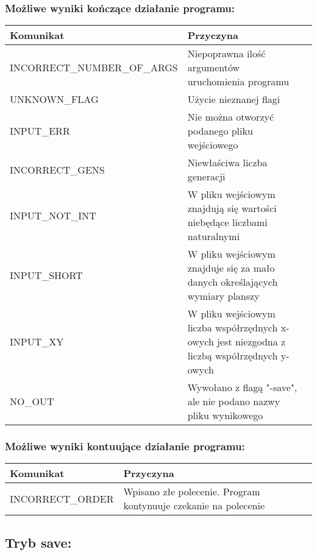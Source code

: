 \documentclass[11pt,a4paper]{report}
\begin{document}
\subsubsection {Możliwe wyniki kończące działanie programu:}
\begin{tabularx}{\textwidth}{  X|Xl  }
 \hline
 Komunikat                                   					& Przyczyna\\
 \hline \hline
			INCORRECT\_NUMBER\_OF\_ARGS	&Niepoprawna ilość argumentów uruchomienia programu\\
 \hline
			UNKNOWN\_FLAG	 			&Użycie nieznanej flagi\\
 \hline
			INPUT\_ERR					&Nie można otworzyć podanego pliku wejściowego\\
 \hline
			INCORRECT\_GENS				&Niewłaściwa liczba generacji\\
 \hline
			INPUT\_NOT\_INT				&W pliku wejściowym znajdują się wartości niebędące liczbami naturalnymi\\
 \hline
			INPUT\_SHORT				&W pliku wejściowym znajduje się za mało danych określających wymiary planszy\\
 \hline
			INPUT\_XY					&W pliku wejściowym liczba współrzędnych x-owych jest niezgodna z liczbą współrzędnych y-owych\\
 \hline
			NO\_OUT					&Wywołano z flagą "-save", ale nie podano nazwy pliku wynikowego\\
 \hline
\end{tabularx}

\subsubsection{Możliwe wyniki kontuujące działanie programu:}
\begin{tabularx}{\textwidth}{  X|Xl  }
\hline
Komunikat                                    					& Przyczyna\\
\hline \hline
			INCORRECT\_ORDER			&Wpisano złe polecenie. Program kontynuuje czekanie na polecenie\\
\hline

\end{tabularx}

\subsection[Tryb save] {Tryb save:}
\end{document}
